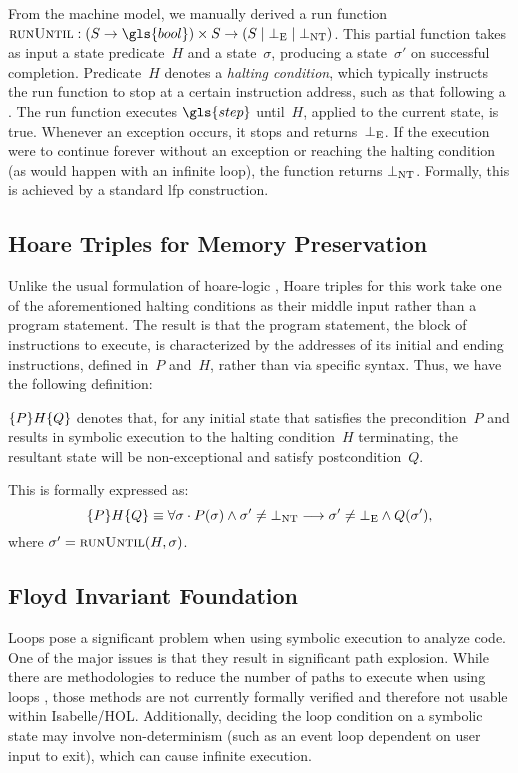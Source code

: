 From the machine model, we manually derived a run function%
$\run:(S\rightarrow\gls{bool})\times S\rightarrow(S\mid\err\mid\infloop)$.
This partial function takes as input a state predicate~$H$ and a state~$\sigma$,%
producing a state~$\sigma'$ on successful completion.
Predicate~$H$ denotes a \emph{halting condition},%
which typically instructs the run function to stop
at a certain instruction address, such as that following a .
The run function executes $\gls{step}$ until~$H$, applied to the current state,
is true. Whenever an exception occurs, it stops and returns~$\bot_\mathrm{E}$.
If the execution were to continue forever
without an exception or reaching the halting condition
(as would happen with an infinite loop), the function returns $\bot_\mathrm{NT}$.
Formally, this is achieved by a standard \ac{lfp} construction.

\subsection{Hoare Triples for Memory Preservation}
Unlike the usual formulation of
\gls{hoare-logic} \autocite{hoare1969axiomatic,myreen2007hoare},%
Hoare triples for this work take one of the aforementioned halting conditions%
as their middle input rather than a program statement.
The result is that the program statement,
the block of instructions to execute, is characterized by the addresses of its initial
and ending instructions, defined in~$P$ and~$H$, rather than via specific syntax.
Thus, we have the following definition:
\begin{definition}\label{def:htriple}
  $\{P\}H\{Q\}$
  denotes that, for any initial state that satisfies the precondition~$P$
  and results in symbolic execution to the halting condition~$H$ terminating,
  the resultant state will be non-exceptional and satisfy postcondition~$Q$.

  This is formally expressed as:
  \begin{equation}
  \{P\}H\{Q\}\equiv\forall\sigma\cdot
  P(\sigma)\land\sigma'\neq\bot_\mathrm{NT}\longrightarrow
  \sigma'\neq\bot_\mathrm{E}\land Q(\sigma'),
  \end{equation}
  where $\sigma'=\operatorname{\textsc{runUntil}}(H,\sigma)$.
\end{definition}

\subsection{Floyd Invariant Foundation}\label{se:cfg_invariant}
Loops pose a significant problem when using symbolic execution to analyze code.%
One of the major issues is that they result in significant path explosion.%
While there are methodologies to reduce the number of paths to execute
when using loops \autocite{saxena2009lese,obdrzalek2011efficient},
those methods are not currently formally verified
and therefore not usable within Isabelle/HOL.
Additionally, deciding the loop condition on a symbolic state
may involve non-determinism (such as an event loop dependent on user input to exit),%
which can cause infinite execution.

